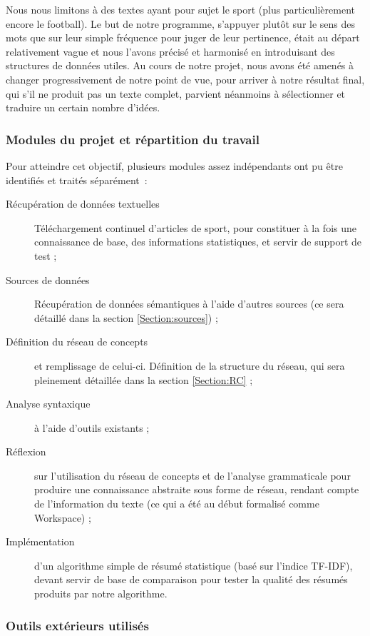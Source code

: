 \documentclass[a4paper, 12pt]{article}
\begin{document}
Nous nous limitons à des textes ayant pour sujet le sport (plus particulièrement encore le football). Le but de notre programme, s'appuyer plutôt sur le sens des mots que sur leur simple fréquence pour juger de leur pertinence, était au départ relativement vague et nous l'avons précisé et harmonisé en introduisant des structures de données utiles. Au cours de notre projet, nous avons été amenés à changer progressivement de notre point de vue, pour arriver à notre résultat final, qui s'il ne produit pas un texte complet, parvient néanmoins à sélectionner et traduire un certain nombre d'idées.


\subsubsection{Modules du projet et répartition du travail}


Pour atteindre cet objectif, plusieurs modules assez indépendants ont pu être identifiés et traités séparément~:


\begin{description}
	\item[Récupération de données textuelles] Téléchargement continuel d'articles de sport, pour constituer à la fois une connaissance de base, des informations statistiques, et servir de support de test ;
	\item[Sources de données] Récupération de données sémantiques à l'aide d'autres sources (ce sera détaillé dans la section \ref{Section:sources}) ;
	\item[Définition du réseau de concepts] et remplissage de celui-ci. Définition de la structure du réseau, qui sera pleinement détaillée dans la section \ref{Section:RC} ;
	\item[Analyse syntaxique] à l'aide d'outils existants ;
	\item[Réflexion] sur l'utilisation du réseau de concepts et de l'analyse grammaticale pour produire une connaissance abstraite sous forme de réseau, rendant compte de l'information du texte (ce qui a été au début formalisé comme Workspace) ;
	\item[Implémentation] d'un algorithme simple de résumé statistique (basé sur l'indice TF-IDF), devant servir de base de comparaison pour tester la qualité des résumés produits par notre algorithme.
\end{description}

\subsubsection{Outils extérieurs utilisés}
\end{document}
